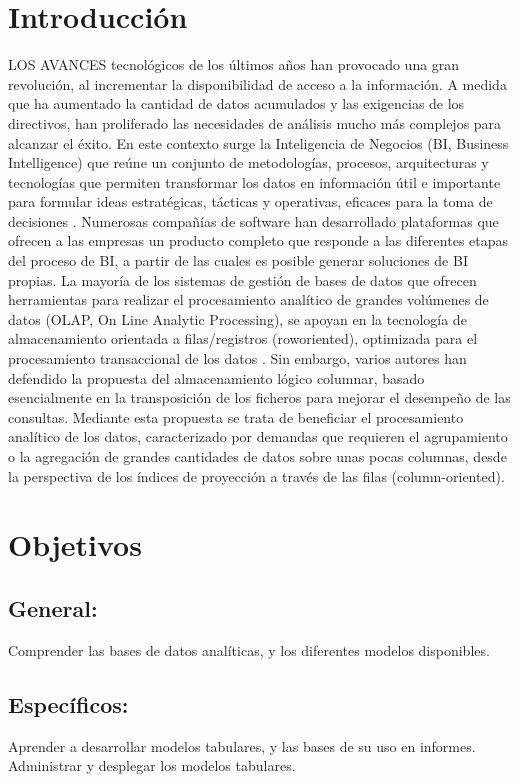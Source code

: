 \documentclass[%
 reprint,
 amsmath,amssymb,
 aps,
]{revtex4-1}
\begin{document}
\section {Introducción}\label{sec:1}
LOS AVANCES tecnológicos de los últimos años han
provocado una gran revolución, al incrementar la
disponibilidad de acceso a la información. A medida que ha
aumentado la cantidad de datos acumulados y las exigencias
de los directivos, han proliferado las necesidades de análisis
mucho más complejos para alcanzar el éxito. En este contexto
surge la Inteligencia de Negocios (BI, Business Intelligence)
que reúne un conjunto de metodologías, procesos,
arquitecturas y tecnologías que permiten transformar los datos
en información útil e importante para formular ideas
estratégicas, tácticas y operativas, eficaces para la toma de
decisiones . Numerosas compañías de software han
desarrollado plataformas que ofrecen a las empresas un
producto completo que responde a las diferentes etapas del
proceso de BI, a partir de las cuales es posible generar
soluciones de BI propias. La mayoría de los sistemas de
gestión de bases de datos que ofrecen herramientas para
realizar el procesamiento analítico de grandes volúmenes de
datos (OLAP, On Line Analytic Processing), se apoyan en la
tecnología de almacenamiento orientada a filas/registros (roworiented),
 optimizada para el procesamiento transaccional de los datos . 
Sin embargo, varios autores han defendido la
propuesta del almacenamiento lógico columnar, basado
esencialmente en la transposición de los ficheros para mejorar
el desempeño de las consultas. Mediante esta propuesta se
trata de beneficiar el procesamiento analítico de los datos,
caracterizado por demandas que requieren el agrupamiento o
la agregación de grandes cantidades de datos sobre unas pocas
columnas, desde la perspectiva de los índices de proyección a
través de las filas (column-oriented). 
\section{Objetivos}\label{sec:2}
\subsection{General:}
Comprender las bases de datos analíticas, y los diferentes modelos disponibles.
\subsection{Específicos:}
Aprender a desarrollar modelos tabulares, y las bases de su uso en informes.
Administrar y desplegar los modelos tabulares.
\end{document}
